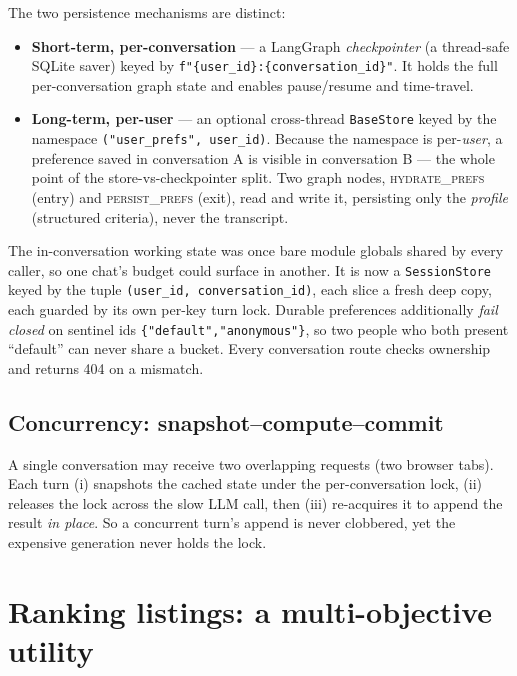 \documentclass[11pt,a4paper]{article}
\newcommand{\code}[1]{\texttt{\small #1}}
\newcommand{\gnode}[1]{\textsc{#1}}  %
\begin{document}
\noindent The two persistence mechanisms are distinct:
\begin{itemize}[leftmargin=1.4em,itemsep=2pt]
  \item \textbf{Short-term, per-conversation} --- a LangGraph \emph{checkpointer}
        (a thread-safe SQLite saver) keyed by \code{f"\{user\_id\}:\{conversation\_id\}"}.
        It holds the full per-conversation graph state and enables pause/resume and
        time-travel.
  \item \textbf{Long-term, per-user} --- an optional cross-thread \code{BaseStore}
        keyed by the namespace \code{("user\_prefs", user\_id)}. Because the namespace
        is per-\emph{user}, a preference saved in conversation A is visible in
        conversation B --- the whole point of the store-vs-checkpointer split. Two
        graph nodes, \gnode{hydrate\_prefs} (entry) and \gnode{persist\_prefs} (exit),
        read and write it, persisting only the \emph{profile} (structured criteria),
        never the transcript.
\end{itemize}

\begin{keybox}
The in-conversation working state was once bare module globals shared by every
caller, so one chat's budget could surface in another. It is now a \code{SessionStore}
keyed by the tuple \code{(user\_id, conversation\_id)}, each slice a fresh deep copy,
each guarded by its own per-key turn lock. Durable preferences additionally
\emph{fail closed} on sentinel ids \code{\{"default","anonymous"\}}, so two people who
both present ``default'' can never share a bucket. Every conversation route checks
ownership and returns 404 on a mismatch.
\end{keybox}

\subsection{Concurrency: snapshot--compute--commit}
A single conversation may receive two overlapping requests (two browser tabs). Each
turn (i) snapshots the cached state under the per-conversation lock, (ii) releases the
lock across the slow LLM call, then (iii) re-acquires it to append the result
\emph{in place}. So a concurrent turn's append is never clobbered, yet the expensive
generation never holds the lock.

\section{Ranking listings: a multi-objective utility}
\label{sec:ranking}
\end{document}
